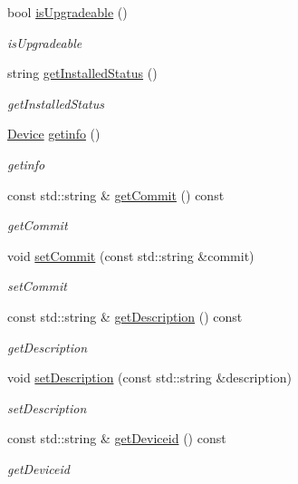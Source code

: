 \begin{DoxyCompactItemize}
bool \hyperlink{classDevice_a1078839b751f8366b5170d4daefa26b4}{is\+Upgradeable} ()
\begin{DoxyCompactList}\small\item\em is\+Upgradeable \end{DoxyCompactList}\item 
string \hyperlink{classDevice_abdadd7bc6fa1760aeaa9f87dd2f96f59}{get\+Installed\+Status} ()
\begin{DoxyCompactList}\small\item\em get\+Installed\+Status \end{DoxyCompactList}\item 
\hyperlink{classDevice}{Device} \hyperlink{classDevice_a2036c2bc77979808046f7ecae94ec602}{getinfo} ()
\begin{DoxyCompactList}\small\item\em getinfo \end{DoxyCompactList}\item 
const std\+::string \& \hyperlink{classDevice_ae5b04fdd1bf82d2dba2ec249e92e4da5}{get\+Commit} () const
\begin{DoxyCompactList}\small\item\em get\+Commit \end{DoxyCompactList}\item 
void \hyperlink{classDevice_a2d549bad1c70b5768698dbc2175669ef}{set\+Commit} (const std\+::string \&commit)
\begin{DoxyCompactList}\small\item\em set\+Commit \end{DoxyCompactList}\item 
const std\+::string \& \hyperlink{classDevice_a6ba1792dd4f33f99e7b3ff97c4fae153}{get\+Description} () const
\begin{DoxyCompactList}\small\item\em get\+Description \end{DoxyCompactList}\item 
void \hyperlink{classDevice_a3f71228960ac3bfca0a1cca254ea782b}{set\+Description} (const std\+::string \&description)
\begin{DoxyCompactList}\small\item\em set\+Description \end{DoxyCompactList}\item 
const std\+::string \& \hyperlink{classDevice_ace938c6c2efffdcc2d17d49440cb55b7}{get\+Deviceid} () const
\begin{DoxyCompactList}\small\item\em get\+Deviceid \end{DoxyCompactList}\item 

\end{DoxyCompactItemize}
